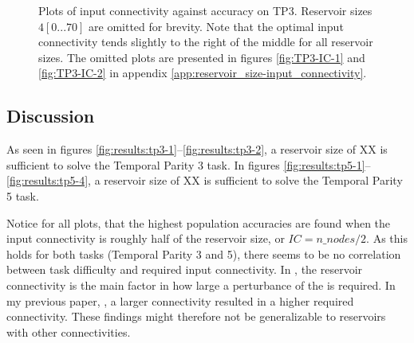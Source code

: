 \begin{figure*}[ht]
    \centering
    \caption{
        Plots of input connectivity against accuracy on TP3. Reservoir sizes $4[0...70]$ are omitted for brevity.
        Note that the optimal input connectivity tends slightly to the right of the middle for all reservoir sizes.
        The omitted plots are presented in figures \ref{fig:TP3-IC-1} and \ref{fig:TP3-IC-2} in appendix \ref{app:reservoir_size-input_connectivity}.
        }
    \label{fig:TP3-IC}
    \resizebox{\textwidth}{!}{
        \subfloat[N=10]{
            
        }
        \subfloat[N=80]{
            
        }
    }
    \resizebox{\textwidth}{!}{
        \subfloat[N=20]{
            
        }
        \subfloat[N=90]{
            
        }
    }
    \resizebox{\textwidth}{!}{
        \subfloat[N=30]{
            
        }
        \subfloat[N=100]{
            
        }
    }
\end{figure*}

\subsection{Discussion}

As seen in figures \ref{fig:results:tp3-1}–\ref{fig:results:tp3-2},
a reservoir size of XX is sufficient to solve the Temporal Parity 3 task.
In figures \ref{fig:results:tp5-1}–\ref{fig:results:tp5-4},
a reservoir size of XX is sufficient to solve the Temporal Parity 5 task.

Notice for all plots, that the highest population accuracies are found when the input connectivity is roughly half of the reservoir size, or $IC=n\_nodes/2$.
As this holds for both tasks (Temporal Parity 3 and 5), there seems to be no correlation between task difficulty and required input connectivity.
In , the reservoir connectivity is the main factor in how large a perturbance of the is required.
In my previous paper, , a larger connectivity resulted in a higher required connectivity.
These findings might therefore not be generalizable to reservoirs with other connectivities.
